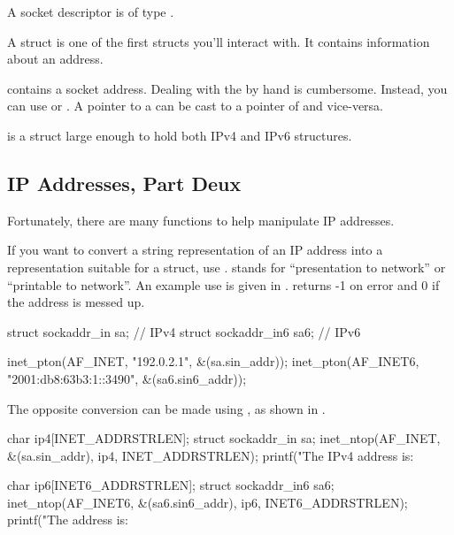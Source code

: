 A socket descriptor is of type .

A  struct is one of the first structs you'll interact with. It contains information about an address. 


 contains a socket address. Dealing with the  by hand is cumbersome. Instead, you can use  or . A pointer to a  can be cast to a pointer of  and vice-versa.

 is a struct large enough to hold both IPv4 and IPv6 structures.

\subsection{IP Addresses, Part Deux}
Fortunately, there are many functions to help manipulate IP addresses. 

If you want to convert a string representation of an IP address into a representation suitable for a struct, use .  stands for ``presentation to network'' or ``printable to network''. An example use is given in .  returns -1 on error and 0 if the address is messed up.

\begin{CPP}[label=list:inet-pton,caption=Presentation to Network]
struct sockaddr_in  sa;  // IPv4
struct sockaddr_in6 sa6; // IPv6

inet_pton(AF_INET, "192.0.2.1", &(sa.sin_addr));
inet_pton(AF_INET6, "2001:db8:63b3:1::3490", &(sa6.sin6_addr));
\end{CPP}

The opposite conversion can be made using , as shown in .

\begin{CPP}[label=list:inet-ntop,caption=Network to Presentation]
char ip4[INET_ADDRSTRLEN];
struct sockaddr_in sa;
inet_ntop(AF_INET, &(sa.sin_addr), ip4, INET_ADDRSTRLEN);
printf("The IPv4 address is: %

char ip6[INET6_ADDRSTRLEN];
struct sockaddr_in6 sa6;
inet_ntop(AF_INET6, &(sa6.sin6_addr), ip6, INET6_ADDRSTRLEN);
printf("The address is: %
\end{CPP}

